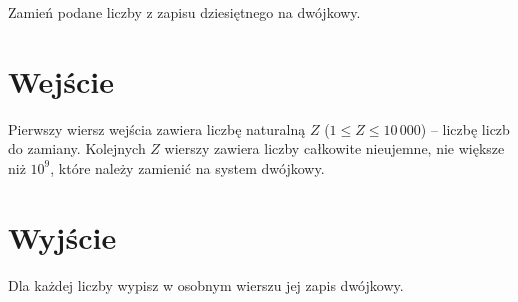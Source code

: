 \documentclass{spiral-kurs}
\begin{document}
  \makeheader
    Zamień podane liczby z zapisu dziesiętnego na dwójkowy.     
      
  \section{Wejście}
    Pierwszy wiersz wejścia zawiera liczbę naturalną $Z$ ($1 \leq Z \leq 10\,000$) -- liczbę liczb do zamiany. Kolejnych $Z$ wierszy zawiera liczby całkowite nieujemne, nie większe niż $10^9$, które należy zamienić na system dwójkowy.
      
  \section{Wyjście}
      Dla każdej liczby wypisz w osobnym wierszu jej zapis dwójkowy.

  
\end{document}
